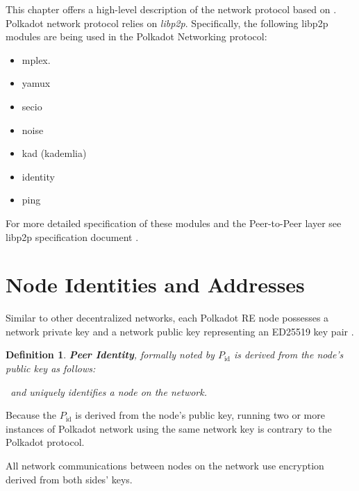\documentclass{book}
\newcommand{\tmem}[1]{{\em #1\/}}
\newcommand{\tmop}[1]{\ensuremath{\operatorname{#1}}}
\newcommand{\tmsamp}[1]{\textsf{#1}}
\newcommand{\tmstrong}[1]{\textbf{#1}}
\newcommand{\tmtextbf}[1]{{\bfseries{#1}}}
\newcommand{\tmtextit}[1]{{\itshape{#1}}}
\newcommand{\tmtextsf}[1]{{\sffamily{#1}}}
\newtheorem{definition}{Definition}
\providecommand{\tmem}[1]{\tmtextit{#1}}
\providecommand{\tmop}[1]{\ensuremath{\mathrm{#1}}}
\providecommand{\tmsamp}[1]{\tmtextsf{#1}}
\providecommand{\tmstrong}[1]{\tmtextbf{#1}}
\providecommand{\tmtextbf}[1]{\tmtextbf{#1}}
\providecommand{\tmtextit}[1]{\tmtextit{#1}}
\newtheorem{definition}{Definition}
\begin{document}
This chapter offers a high-level description of the network protocol based on
{\cite{parity_technologies_substrate_2019}}. Polkadot network protocol relies
on {\tmem{libp2p}}. Specifically, the following libp2p modules are being used
in the Polkadot Networking protocol:
\begin{itemize}
  \item {\tmsamp{mplex.}}
  
  \item {\tmsamp{yamux}}
  
  \item {\tmsamp{secio}}
  
  \item {\tmsamp{noise}}
  
  \item {\tmsamp{kad}} (kademlia)
  
  \item {\tmsamp{identity}}
  
  \item {\tmsamp{ping}}
\end{itemize}
For more detailed specification of these modules and the Peer-to-Peer layer
see libp2p specification document {\cite{protocol_labs_libp2p_2019}}.

\section{Node Identities and Addresses}

Similar to other decentralized networks, each Polkadot RE node possesses a
network private key and a network public key representing an ED25519 key pair
{\cite{liusvaara_edwards-curve_2017}}.

{}

\begin{definition}
  {\tmstrong{Peer Identity}}, formally noted by $P_{\tmop{id}}$ is derived
  from the node's public key as follows:
  
  {\todo{SPEC: How to derive $P_{\tmop{id}}$}} \ and uniquely identifies a
  node on the network.
\end{definition}

Because the $P_{\tmop{id}}$ is derived from the node's public key, running two
or more instances of Polkadot network using the same network key is contrary
to the Polkadot protocol.

All network communications between nodes on the network use encryption derived
from both sides' keys.
\end{document}

